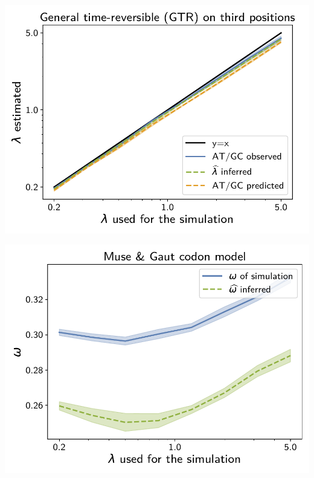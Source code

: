 \documentclass{article}
\begin{document}
\begin{center}
    \begin{minipage}{0.325\linewidth}
        \includegraphics[width=\linewidth, page=1]{inference_supp_mat/PrimatesExons10Mu8.0_lambda_GTR.pdf}
    \end{minipage}
    \hfill
    \begin{minipage}{0.325\linewidth}
        \includegraphics[width=\linewidth, page=1]{inference_supp_mat/PrimatesExons10Mu8.0_omega_MG.pdf}
    \end{minipage}
    \begin{minipage}{0.325\linewidth}

\end{minipage}
\end{center}
\end{document}
